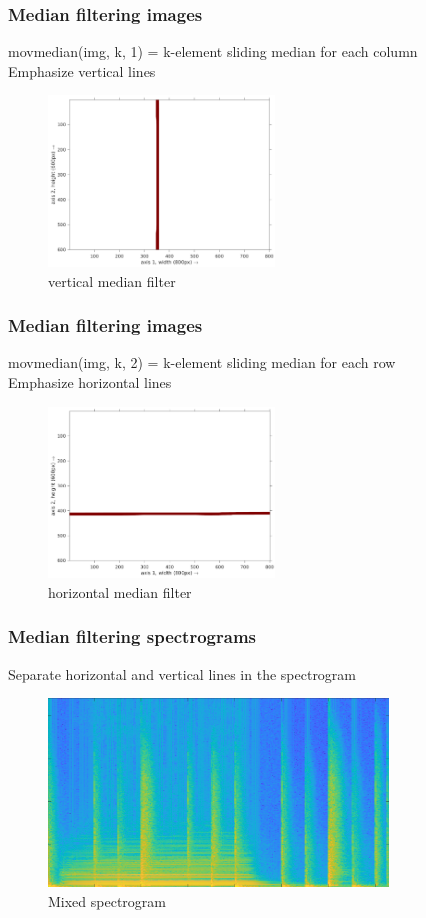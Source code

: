 \documentclass{beamer}
\begin{document}
\begin{frame}
	\frametitle{Median filtering images}
	movmedian(img, k, 1) = k-element sliding median for each column\\
	Emphasize vertical lines
	\begin{figure}
	\includegraphics[width=6cm]{../images/medfilter_basic_axis1.png}
		\caption{vertical median filter}
	\end{figure}
\end{frame}

\begin{frame}
	\frametitle{Median filtering images}
	movmedian(img, k, 2) = k-element sliding median for each row\\
	Emphasize horizontal lines
	\begin{figure}
	\includegraphics[width=6cm]{../images/medfilter_basic_axis2.png}
		\caption{horizontal median filter}
	\end{figure}
\end{frame}

\begin{frame}
	\frametitle{Median filtering spectrograms}
	Separate horizontal and vertical lines in the spectrogram
	\begin{figure}
	\includegraphics[height=5cm]{../images/mixedspecgram_cropped.png}
		\caption{Mixed spectrogram}
	\end{figure}
\end{frame}
\end{document}
